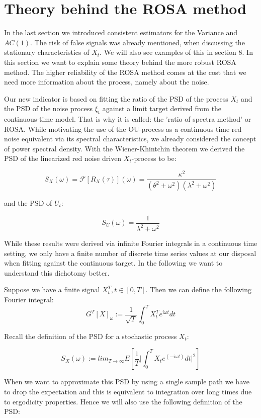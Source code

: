 \documentclass[%
thesis=student,%
coverpage=false,%
titlepage=false,%
headmarks=true, %
english,%
font=libertine, %
math=newpxtx, %
BCOR=5mm,%
coverBCOR=11mm%
]{tumbook}
\begin{document}
\chapter{Theory behind the ROSA method}

In the last section we introduced consistent estimators for the Variance and $AC(1)$. The risk of false signals was already mentioned, when discussing the stationary characteristics of $X_{t}$. We will also see examples of this in section 8. In this section we want to explain some theory behind the more robust ROSA method. The higher reliability of the ROSA method comes at the cost that we need more information about the process, namely about the noise. 

Our new indicator is based on fitting the ratio of the PSD of the process $X_{t}$ and the PSD of the noise process $\xi_{t}$ against a limit target derived from the continuous-time model. That is why it is called: the 'ratio of spectra method' or ROSA. While motivating the use of the OU-process as a continuous time red noise equivalent via its spectral characteristics, we already considered the concept of power spectral density. With the Wiener-Khintchin theorem we derived the PSD of the linearized red noise driven $X_{t}$-process to be:

\[
S_{X}(\omega) = \mathcal{F}[R_{X}(\tau)](\omega) = \frac{\kappa^{2}}{(\theta^{2} + \omega^{2})(\lambda^{2} + \omega^{2})}
\]

and the PSD of $U_{t}$:

\[
S_{U}(\omega) = \frac{1}{\lambda^2 + \omega^2}
\]

While these results were derived via infinite Fourier integrals in a continuous time setting, we only have a finite number of discrete time series values at our disposal when fitting against the continuous target. In the following we want to understand this dichotomy better.

Suppose we have a finite signal $X_{t}^{T}, t \in [0,T]$. Then we can define the following Fourier integral: 
\[
    G^{T}[X]_{\omega} := \frac{1}{\sqrt{T}}\int_{0}^{T}X_{t}^{T}e^{i \omega t}dt
\]

Recall the definition of the PSD for a stochastic process $X_{t}$:

\[
S_{X}(\omega) := lim_{T\rightarrow\infty}E[\frac{1}{T}\lvert\int_{0}^{T}X_{t}e^{(-i\omega t)}dt \rvert^{2}]
\]

When we want to approximate this PSD by using a single sample path we have to drop the expectation and this is equivalent to integration over long times due to ergodicity properties. Hence we will also use the following definition of the PSD:
\end{document}
